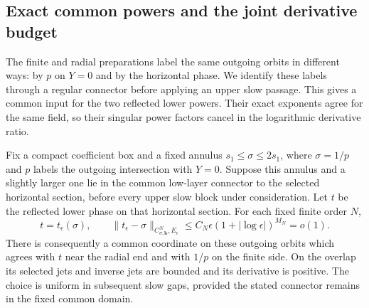 \subsection{Exact common powers and the joint derivative budget}

The finite and radial preparations label the same outgoing orbits in
different ways: by $p$ on $Y=0$ and by the horizontal phase.  We
identify these labels through a regular connector before applying an
upper slow passage.  This gives a common input for the two reflected
lower powers.  Their exact exponents agree for the same field, so
their singular power factors cancel in the logarithmic derivative
ratio.

\begin{lemma}\label{rw:transitions:common-input}
Fix a compact coefficient box and a fixed annulus
$s_1\le\sigma\le2s_1$, where $\sigma=1/p$ and $p$ labels the
outgoing intersection with $Y=0$. Suppose this annulus and a slightly
larger one lie in the common low-layer connector to the selected
horizontal section, before every upper slow block under consideration.
Let $t$ be the reflected lower phase on that horizontal section.
For each fixed finite order $N$,
\[
 t=t_\epsilon(\sigma),\qquad
 \|t_\epsilon-\sigma\|_{C^N_{\sigma,\mathbf b},E_\epsilon}
 \le C_N\epsilon(1+|\log\epsilon|)^{M_N}=o(1).
\]
There is consequently a common coordinate on these outgoing orbits
which agrees with $t$ near the radial end and with $1/p$ on the
finite side. On the overlap its selected jets and inverse jets are
bounded and its derivative is positive. The choice is uniform in
subsequent slow gaps, provided the stated connector remains in the
fixed common domain.
\end{lemma}
